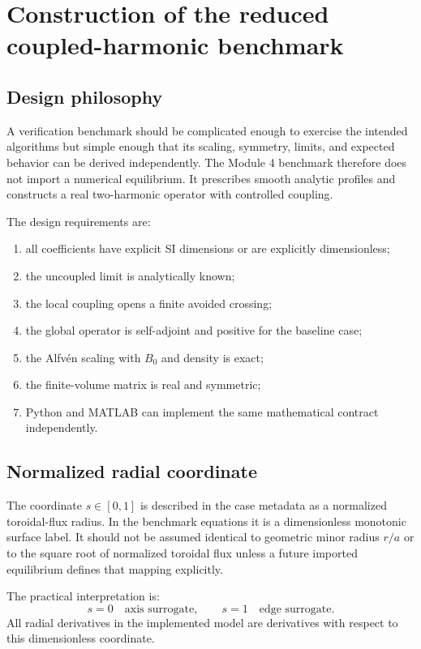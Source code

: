 \section{Construction of the reduced coupled-harmonic benchmark}
\label{sec:benchmark_construction}

\subsection{Design philosophy}
A verification benchmark should be complicated enough to exercise the intended algorithms but simple enough that its scaling, symmetry, limits, and expected behavior can be derived independently. The Module 4 benchmark therefore does not import a numerical equilibrium. It prescribes smooth analytic profiles and constructs a real two-harmonic operator with controlled coupling.

The design requirements are:
\begin{enumerate}[leftmargin=1.6em]
\item all coefficients have explicit SI dimensions or are explicitly dimensionless;
\item the uncoupled limit is analytically known;
\item the local coupling opens a finite avoided crossing;
\item the global operator is self-adjoint and positive for the baseline case;
\item the Alfv\'en scaling with $B_0$ and density is exact;
\item the finite-volume matrix is real and symmetric;
\item Python and MATLAB can implement the same mathematical contract independently.
\end{enumerate}

\subsection{Normalized radial coordinate}
The coordinate $s\in[0,1]$ is described in the case metadata as a normalized toroidal-flux radius. In the benchmark equations it is a dimensionless monotonic surface label. It should not be assumed identical to geometric minor radius $r/a$ or to the square root of normalized toroidal flux unless a future imported equilibrium defines that mapping explicitly.

The practical interpretation is:
\begin{equation}
s=0\quad\text{axis surrogate},
\qquad
s=1\quad\text{edge surrogate}.
\end{equation}
All radial derivatives in the implemented model are derivatives with respect to this dimensionless coordinate.

